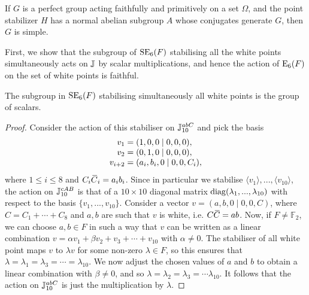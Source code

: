 \begin{lemma}[Iwasawa]
    If $G$ is a perfect group acting faithfully and primitively 
    on a set $\Omega$, and the point stabilizer $H$ has a normal
    abelian subgroup $A$ whose conjugates generate $G$, then
    $G$ is simple.
\end{lemma}

First, we show that the subgroup of $\mathrm{SE}_6(F)$ stabilising 
all the white points simultaneously acts on $\mathbb{J}$ by scalar multiplications, and hence
the action of $\mathrm{E}_6(F)$ on the set of white points is faithful.

\begin{lemma}
	The subgroup in $\mathrm{SE}_6(F)$ stabilising simultaneously all white points
	is the group of scalars.  
\end{lemma}

\begin{proof}
 Consider the action of
this stabiliser on $\mathbb{J}_{10}^{abC}$ and pick the basis
\begin{equation}
	\begin{array}{r@{\;}c@{\;}l}
		v_1 & = & (1,0,0\mid 0,0,0), \\
		v_2 & = & (0,1,0\mid 0,0,0), \\
		v_{i+2} & = & (a_i, b_i,0\mid 0,0,C_i),
	\end{array}
\end{equation} 
where $1 \leqslant i \leqslant 8$ and $C_i \mathord{\mbox{\hspace*{0pt}}\,\overline{\!C\!\!\;}\!\:}\mbox{\hspace*{0pt}}_i = a_i b_i$. Since in particular we stabilise
$\langle v_1 \rangle,...,\langle v_{10}\rangle$, the action on $\mathbb{J}_{10}^{cAB}$ is that of a 
$10 \times 10$ diagonal matrix $\mathrm{diag}(\lambda_1, ..., \lambda_{10})$ 
with respect to the basis $\{v_1, ..., v_{10}\}$. Consider 
a vector $v = (a,b,0\mid 0,0,C)$, where \mbox{$C = C_1 + \cdots + C_8$} and 
$a,b$ are such that $v$ is white, i.e. $C\mathord{\mbox{\hspace*{0pt}}\,\overline{\!C\!\!\;}\!\:}\mbox{\hspace*{0pt}} = ab$. Now, if $F\neq \mathbb{F}_2$, we can choose
$a,b \in F$ in such a way that $v$ can be written as a linear combination 
$v = \alpha v_1 + \beta v_2 + v_3 + \cdots + v_{10}$ with $\alpha \neq 0$. The stabiliser of 
all white point maps $v$ to $\lambda v$ for some non-zero $\lambda \in F$, so this ensures
that $\lambda = \lambda_1 = \lambda_3 = \cdots = \lambda_{10}$. We now adjust the chosen values
of $a$ and $b$ to obtain a linear combination with $\beta \neq 0$, and so $\lambda = 
\lambda_2 = \lambda_3 = \cdots \lambda_{10}$. It follows that the action on $\mathbb{J}_{10}^{abC}$ 
is just the multiplication by $\lambda$. 


\end{proof}
